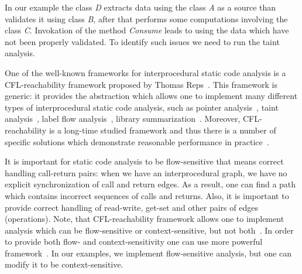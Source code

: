 In our example the class \textit{D} extracts data using the class \textit{A} as a source than validates it using class \textit{B}, after that performs some computations involving the class \textit{C}.
Invokation of the method \textit{Consume} leads to using the data which have not been properly validated.
To identify such issues we need to run the taint analysis.

One of the well-known frameworks for interprocedural static code analysis is a CFL-reachability framework proposed by Thomas Reps~\cite{Reps}.
This framework is generic: it provides the abstraction which allows one to implement many different types of interprocedural static code analysis, such as pointer analysis~\cite{Zheng, JavaCFL}, taint analysis~\cite{Huang:2015:SPT:2771783.2771803}, label flow analysis~\cite{10.1007/11823230_7,CFLr}, library summarization~\cite{10.1007/978-3-662-54434-1_33}.
Moreover, CFL-reachability is a long-time studied framework and thus there is a number of specific solutions which demonstrate reasonable performance in practice~\cite{Wang:2017:GSD:3093315.3037744}.

It is important for static code analysis to be flow-sensitive that means correct handling call-return pairs: when we have an interprocedural graph, we have no explicit synchronization of call and return edges.
As a result, one can find a path which contains incorrect sequences of calls and returns.
Also, it is important to provide correct handling of read-write, get-set and other pairs of edges (operations).
Note, that CFL-reachability framework allows one to implement analysis which can be flow-sensitive or context-sensitive, but not both~\cite{Reps:2000:UCD:345099.345137}.
In order to provide both flow- and context-sensitivity one can use more powerful framework~\cite{Zhang:2017:CDA:3093333.3009848}.
In our examples, we implement flow-sensitive analysis, but one can modify it to be context-sensitive.

